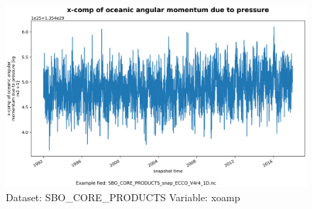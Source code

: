 \begin{figure}[H]
\centering
\includegraphics[width=\textwidth]{../images/plots/oneD_plots/SBO_Core_Products/xoamp.png}
\caption{Dataset: SBO\_CORE\_PRODUCTS Variable: xoamp}
\label{tab:table-SBO_CORE_PRODUCTS_xoamp-Plot}
\end{figure}
\pagebreak
